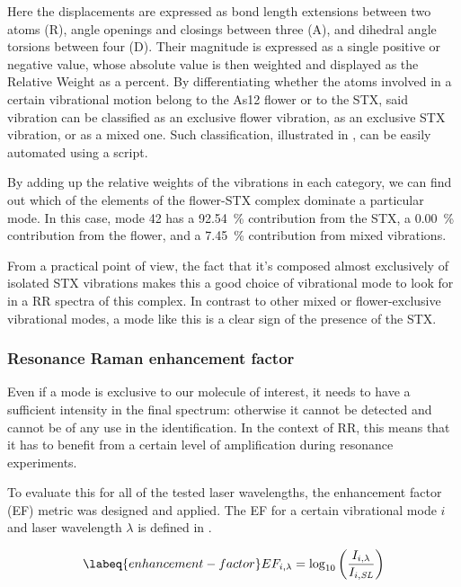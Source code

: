 Here the displacements are expressed as bond length extensions between two atoms (R), angle openings and closings between three (A), and dihedral angle torsions between four (D).
Their magnitude is expressed as a single positive or negative value, whose absolute value is then weighted and displayed as the Relative Weight as a percent.
By differentiating whether the atoms involved in a certain vibrational motion belong to the As12 flower or to the STX, said vibration can be classified as an exclusive flower vibration, as an exclusive STX vibration, or as a mixed one.
Such classification, illustrated in , can be easily automated using a script.

By adding up the relative weights of the vibrations in each category, we can find out which of the elements of the flower-STX complex dominate a particular mode.
In this case, mode 42 has a \SI{92.54}{\percent} contribution from the STX, a \SI{0.00}{\percent} contribution from the flower, and a \SI{7.45}{\percent} contribution from mixed vibrations.

From a practical point of view, the fact that it's composed almost exclusively of isolated STX vibrations makes this a good choice of vibrational mode to look for in a RR spectra of this complex.
In contrast to other mixed or flower-exclusive vibrational modes, a mode like this is a clear sign of the presence of the STX.

\subsubsection{Resonance Raman enhancement factor}
Even if a mode is exclusive to our molecule of interest, it needs to have a sufficient intensity in the final spectrum: otherwise it cannot be detected and cannot be of any use in the identification.
In the context of RR, this means that it has to benefit from a certain level of amplification during resonance experiments.

To evaluate this for all of the tested laser wavelengths, the enhancement factor (EF) metric was designed and applied.
The EF for a certain vibrational mode $i$ and laser wavelength $\lambda$  is defined in .

\begin{equation}
    \labeq{enhancement-factor}
    EF_{i,\lambda} = \log_{10}\left(\frac{I_{i,\lambda}}{I_{i,\textit{SL}}}\right)
\end{equation}

